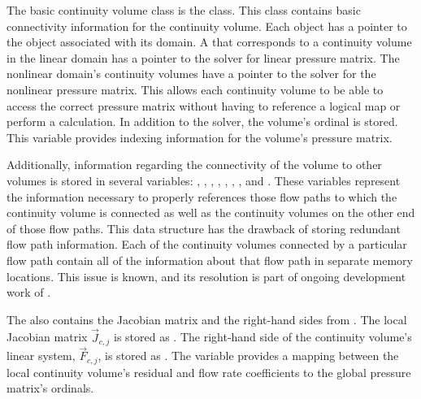 The basic continuity volume class is the  class.
This class contains basic connectivity information for the continuity volume.
Each  object has a pointer to the  object associated with its domain.
A  that corresponds to a continuity volume in the linear domain has a  pointer to the solver for linear pressure matrix.
The nonlinear domain's continuity volumes have a  pointer to the solver for the nonlinear pressure matrix.
This allows each continuity volume to be able to access the correct pressure matrix without having to reference a logical map or perform a calculation.
In addition to the solver, the volume's ordinal is stored.
This variable provides indexing information for the volume's pressure matrix.

Additionally, information regarding the connectivity of the volume to other volumes is stored in several variables: , , , , , , , and .
These variables represent the information necessary to properly references those flow paths to which the continuity volume is connected as well as the continuity volumes on the other end of those flow paths.
This data structure has the drawback of storing redundant flow path information.
Each of the continuity volumes connected by a particular flow path contain all of the information about that flow path in separate memory locations.
This issue is known, and its resolution is part of ongoing development work of \cobra{}.

The  also contains the Jacobian matrix and the right-hand sides from .
The local Jacobian matrix $\vec{J}_{c, j}$ is stored as .
The right-hand side of the continuity volume's linear system, $\vec{F}_{c, j}$, is stored as .
The variable  provides a mapping between the local continuity volume's residual and flow rate coefficients to the global pressure matrix's ordinals.

